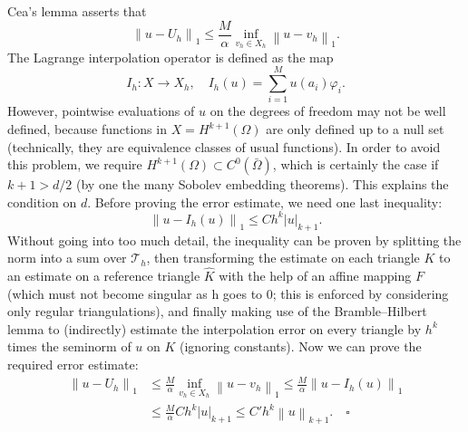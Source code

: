 \documentclass[a4paper]{article}
\newcommand{\norm}[1]{\left\lVert#1\right\rVert}
\newcommand{\seminorm}[1]{\left\lvert#1\right\rvert}
\begin{document}
\begin{description}
\begin{itemize}
	\end{itemize}
	Cea's lemma asserts that
	\[
	\norm{u-U_h}_1 \leq \frac{M}{\alpha} \inf_{v_h \in X_h} \norm{u-v_h}_1.
	\]
	The Lagrange interpolation operator is defined as the map
	\[
	I_h \colon X \to X_h, \quad I_h(u) = \sum_{i = 1}^M u(a_i) \varphi_i.
	\]
	However, pointwise evaluations of $u$ on the degrees of freedom
	may not be well defined,
	because functions in $X = H^{k+1}(\Omega)$ are only defined
	up to a null set (technically, they are equivalence classes of usual functions).
	In order to avoid this problem, we require
	$H^{k+1}(\Omega) \subset C^0(\bar{\Omega})$, which is certainly the case
	if $k+1 > d/2$ (by one the many Sobolev embedding theorems).
	This explains the condition on $d$.
	Before proving the error estimate, we need one last inequality:
	\[
	\norm{u - I_h(u)}_1 \leq C h^k \seminorm{u}_{k+1}.
	\]
	Without going into too much detail, the inequality can be proven
	by splitting the norm into a sum over $\mathcal{T}_h$,
	then transforming the estimate on each triangle $K$
	to an estimate on a reference triangle $\hat{K}$
	with the help of an affine mapping $F$ (which must not become singular
	as h goes to 0; this is enforced by considering only regular triangulations),
	and finally making use of the Bramble–Hilbert lemma to (indirectly) estimate
	the interpolation error on every triangle by $h^k$ times
	the seminorm of $u$ on $K$ (ignoring constants).
	Now we can prove the required error estimate:
	\begin{align*}
	\norm{u-U_h}_1
&	\leq \frac{M}{\alpha} \inf_{v_h \in X_h} \norm{u-v_h}_1
	\leq \frac{M}{\alpha} \norm{u-I_h(u)}_1 \\
&	\leq \frac{M}{\alpha} C h^k \seminorm{u}_{k+1}
	\leq C' h^k \norm{u}_{k+1}. \quad \square
	\end{align*}
\end{description}
\end{document}
